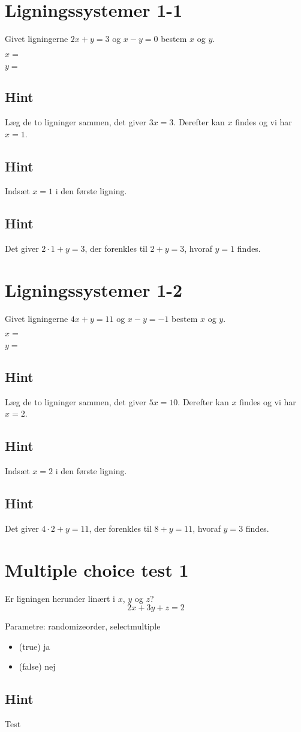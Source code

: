 \documentclass{article}
\newenvironment{exercise}[1]{\newpage\section{#1}}{}
\newcommand{\answerbox}[1]{\fbox{$#1$}}
\newenvironment{multichoice}[1][]{\par\noindent{}Parametre: #1\begin{itemize}}{\end{itemize}}
\newcommand{\itemtrue}{\item (true) }
\newcommand{\itemfalse}{\item (false) }
\newcommand{\hint}{\subsection*{Hint}}
\begin{document}
\tableofcontents
\newpage

\begin{exercise}{Ligningssystemer 1-1}

Givet ligningerne \(2x + y = 3\) og \(x - y = 0\) bestem \(x\) og \(y\).

\(x = \) \answerbox{1}

\(y = \) \answerbox{1}

\hint

Læg de to ligninger sammen, det giver \(3x = 3\). Derefter kan \(x\) findes og vi har \(x = 1\).

\hint
Indsæt \(x = 1\) i den første ligning. 

\hint
Det giver \(2 \cdot 1 + y = 3\), der forenkles til \(2 + y = 3\), 
hvoraf \(y = 1\) findes.

\end{exercise}



\begin{exercise}{Ligningssystemer 1-2}

Givet ligningerne \(4x + y = 11\) og \(x - y = -1\) bestem \(x\) og \(y\).

\(x = \) \answerbox{2}

\(y = \) \answerbox{3}

\hint

Læg de to ligninger sammen, det giver \(5x = 10\). Derefter kan \(x\) findes og vi har \(x = 2\).

\hint
Indsæt \(x = 2\) i den første ligning. 

\hint
Det giver \(4 \cdot 2 + y = 11\), der forenkles til \(8 + y = 11\), 
hvoraf \(y = 3\) findes.

\end{exercise}



\begin{exercise}{Multiple choice test 1}

Er ligningen herunder linært i $x$, $y$ og $z$?
\[
2x + 3y + z = 2
\]

\begin{multichoice}[randomizeorder, selectmultiple]
\itemtrue ja
\itemfalse nej
\end{multichoice}

\hint
Test

\end{exercise}
\end{document}
